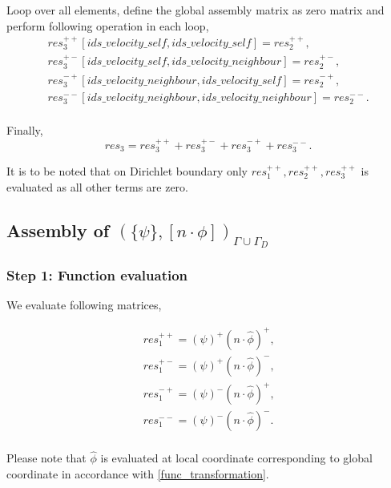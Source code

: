 \documentclass[a4paper,twoside,openright]{book}
\begin{document}
Loop over all elements, define the global assembly matrix as zero matrix and perform following operation in each loop,
\begin{equation}
\begin{split}
res_3^{++}[ids\_velocity\_self,ids\_velocity\_self] = res_2^{++} \textrm{,}\\
res_3^{+-}[ids\_velocity\_self,ids\_velocity\_neighbour] = res_2^{+-} \textrm{,}\\
res_3^{-+}[ids\_velocity\_neighbour,ids\_velocity\_self] = res_2^{-+} \textrm{,}\\
res_3^{--}[ids\_velocity\_neighbour,ids\_velocity\_neighbour] = res_2^{--} \textrm{.}\\
\end{split}
\end{equation}

Finally,
\begin{equation}
res_3 = res_3^{++} + res_3^{+-} + res_3^{-+} + res_3^{--} \textrm{.}
\end{equation}

It is to be noted that on Dirichlet boundary only $res_1^{++}, res_2^{++}, res_3^{++}$ is evaluated as all other terms are zero.

\subsection{Assembly of $(\lbrace \psi \rbrace, [n \cdot \phi])_{\Gamma \cup \Gamma_D}$}

\subsubsection{Step 1: Function evaluation}

We evaluate following matrices, 

\begin{equation}
\begin{split}
res_1^{++} = (\psi)^+ (n \cdot \hat{\phi})^+ \textrm{,}\\
res_1^{+-} = (\psi)^+ (n \cdot \hat{\phi})^- \textrm{,}\\
res_1^{-+} = (\psi)^- (n \cdot \hat{\phi})^+ \textrm{,}\\
res_1^{--} = (\psi)^- (n \cdot \hat{\phi})^- \textrm{.}\\
\end{split}
\end{equation}

Please note that $\hat{\phi}$ is evaluated at local coordinate corresponding to global coordinate in accordance with \eqref{func_transformation}.
\end{document}
